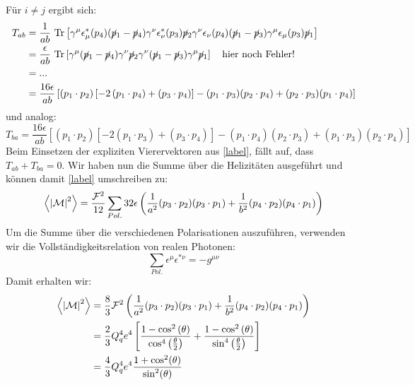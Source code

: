 Für $i \neq j$ ergibt sich:
\begin{equation}
	\begin{aligned}
	T_{ab} &= \frac{1}{ab}~\text{Tr}\left[\gamma^\mu \epsilon^*_\mu(p_4) (\cancel{p}_1- \cancel{p}_4)  \gamma^\nu \epsilon_\nu^*(p_3) \cancel{p}_2 \gamma^\nu \epsilon_\nu(p_4) (\cancel{p}_1- \cancel{p}_3)  \gamma^\mu \epsilon_\mu(p_3) \cancel{p}_1 \right] \\
	&=\frac{\epsilon}{ab}~\text{Tr}\left[\gamma^\mu (\cancel{p}_1- \cancel{p}_4)  \gamma^\nu \cancel{p}_2 \gamma^\nu (\cancel{p}_1- \cancel{p}_3)  \gamma^\mu \cancel{p}_1 \right] \quad \text{hier noch Fehler!} \\
	&= ... \\
	&=  \frac{16 \epsilon}{ab} \left[\left( p_1\cdot p_2\right) \left[ -2 \left( p_1 \cdot p_4 \right) + \left(p_3 \cdot p_4\right)\right] - (p_1\cdot p_3)(p_2\cdot p_4) + (p_2\cdot p_3)(p_1\cdot p_4)\right]
	\end{aligned}
\end{equation}
und analog:
\begin{equation}
	T_{ba} = \frac{16 \epsilon}{ab} \left[\left( p_1\cdot p_2\right) \left[ -2 \left( p_1 \cdot p_3 \right) + \left(p_3 \cdot p_4\right)\right] - (p_1\cdot p_4)(p_2\cdot p_3) + (p_1\cdot p_3)(p_2\cdot p_4)\right]
\end{equation}
Beim Einsetzen der expliziten Vierervektoren aus \autoref{label}, fällt auf, dass $T_{ab} + T_{ba} = 0$. Wir haben nun die Summe über die Helizitäten ausgeführt und können damit \autoref{label} umschreiben zu:
\begin{equation}
	\left\langle  \abs{\mathcal{M}}^2\right\rangle = \frac{\mathcal{F}^2}{12}\sum_{Pol.}32 \epsilon\left(\frac{1}{a^2}(p_3\cdot p_2)(p_3\cdot p_1) + \frac{1}{b^2} (p_4\cdot p_2)(p_4\cdot p_1) \right)
\end{equation}
Um die Summe über die verschiedenen Polarisationen auszuführen, verwenden wir die Vollständigkeitsrelation von realen Photonen:
\begin{equation}
	\sum_{Pol.} \epsilon^\mu \epsilon^{*\nu} = -g^{\mu \nu}
\end{equation}
Damit erhalten wir:
\begin{equation}
	\begin{aligned}
		\left\langle  \abs{\mathcal{M}}^2\right\rangle &= \frac{8}{3}\mathcal{F}^2 \left(\frac{1}{a^2}(p_3\cdot p_2)(p_3\cdot p_1) + \frac{1}{b^2} (p_4\cdot p_2)(p_4\cdot p_1) \right) \\
		&= \frac{2}{3}Q_q^4e^4\left[\frac{1-\cos^2\left(\theta\right)}{\cos^4\left(\frac{\theta}{2}\right)} + \frac{1-\cos^2\left(\theta\right)}{\sin^4\left(\frac{\theta}{2}\right)}\right] \\
		&=\frac{4}{3} Q_q^4e^4\frac{1+\cos^2(\theta)}{\sin^2(\theta)}
	\end{aligned}
\end{equation}
